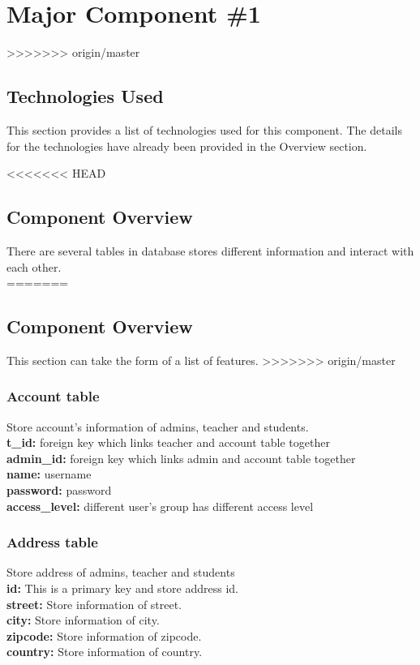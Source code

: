 \section{Major Component \#1 }
>>>>>>> origin/master

\subsection{Technologies  Used}
This section provides a list of technologies used for this component.  The details 
for the technologies have already been provided in the Overview section. 

<<<<<<< HEAD
\subsection{Component Overview}
There are several tables in database stores different information and interact with each other.\\
=======
\subsection{Component  Overview}
This section can take the form of a list of features. 
>>>>>>> origin/master

\subsubsection{Account table}
Store account's information of admins, teacher and students.\\
\textbf{t\_id:} foreign key which links teacher and account table together\\
\textbf{admin\_id:} foreign key which links admin and account table together\\
\textbf{name:} username\\
\textbf{password:} password\\
\textbf{access\_level:} different user's group has different access level

\subsubsection{Address table}
Store address of admins, teacher and students\\
\textbf{id:} This is a primary key and store address id.\\
\textbf{street:} Store information of street.\\
\textbf{city:} Store information of city.\\
\textbf{zipcode:} Store information of zipcode.\\
\textbf{country:} Store information of country.\\
